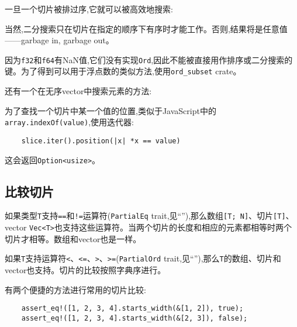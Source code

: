 
一旦一个切片被排过序,它就可以被高效地搜索:


当然,二分搜索只在切片在指定的顺序下有序时才能工作。否则,结果将是任意值——garbage in, garbage out。

因为\texttt{f32}和\texttt{f64}有NaN值,它们没有实现\texttt{Ord},因此不能被直接用作排序或二分搜索的键。为了得到可以用于浮点数的类似方法,使用\texttt{ord\_subset} crate。

还有一个在无序vector中搜索元素的方法:


为了查找一个切片中某一个值的位置,类似于JavaScript中的\texttt{array.indexOf(value)},使用迭代器:
\begin{verbatim}
    slice.iter().position(|x| *x == value)
\end{verbatim}
这会返回\texttt{Option<usize>}。

\subsection{比较切片}
如果类型\texttt{T}支持\texttt{==}和\texttt{!=}运算符(\texttt{PartialEq} trait,见“”),那么数组\texttt{[T; N]}、切片\texttt{[T]}、vector \texttt{Vec<T>}也支持这些运算符。当两个切片的长度和相应的元素都相等时两个切片才相等。数组和vector也是一样。

如果\texttt{T}支持运算符\texttt{<}、\texttt{<=}、\texttt{>}、\texttt{>=}(\texttt{PartialOrd} trait,见“”),那么\texttt{T}的数组、切片和vector也支持。切片的比较按照字典序进行。

有两个便捷的方法进行常用的切片比较:

\begin{verbatim}
    assert_eq!([1, 2, 3, 4].starts_width(&[1, 2]), true);
    assert_eq!([1, 2, 3, 4].starts_width(&[2, 3]), false);
\end{verbatim}


